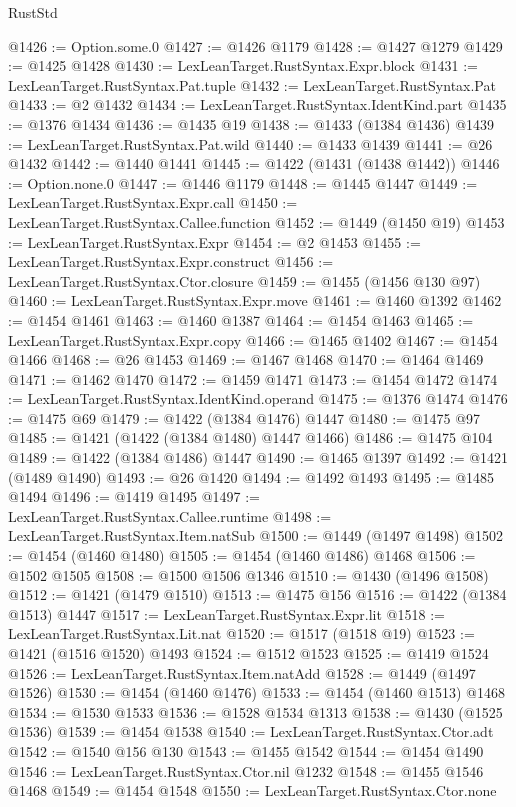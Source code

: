 \begin{lexlean}{RustStd}
\begin{coremodule}
@1426 := Option.some.{0}
@1427 := @1426 @1179
@1428 := @1427 @1279
@1429 := @1425 @1428
@1430 := LexLeanTarget.RustSyntax.Expr.block
@1431 := LexLeanTarget.RustSyntax.Pat.tuple
@1432 := LexLeanTarget.RustSyntax.Pat
@1433 := @2 @1432
@1434 := LexLeanTarget.RustSyntax.IdentKind.part
@1435 := @1376 @1434
@1436 := @1435 @19
@1438 := @1433 (@1384 @1436)
@1439 := LexLeanTarget.RustSyntax.Pat.wild
@1440 := @1433 @1439
@1441 := @26 @1432
@1442 := @1440 @1441
@1445 := @1422 (@1431 (@1438 @1442))
@1446 := Option.none.{0}
@1447 := @1446 @1179
@1448 := @1445 @1447
@1449 := LexLeanTarget.RustSyntax.Expr.call
@1450 := LexLeanTarget.RustSyntax.Callee.function
@1452 := @1449 (@1450 @19)
@1453 := LexLeanTarget.RustSyntax.Expr
@1454 := @2 @1453
@1455 := LexLeanTarget.RustSyntax.Expr.construct
@1456 := LexLeanTarget.RustSyntax.Ctor.closure
@1459 := @1455 (@1456 @130 @97)
@1460 := LexLeanTarget.RustSyntax.Expr.move
@1461 := @1460 @1392
@1462 := @1454 @1461
@1463 := @1460 @1387
@1464 := @1454 @1463
@1465 := LexLeanTarget.RustSyntax.Expr.copy
@1466 := @1465 @1402
@1467 := @1454 @1466
@1468 := @26 @1453
@1469 := @1467 @1468
@1470 := @1464 @1469
@1471 := @1462 @1470
@1472 := @1459 @1471
@1473 := @1454 @1472
@1474 := LexLeanTarget.RustSyntax.IdentKind.operand
@1475 := @1376 @1474
@1476 := @1475 @69
@1479 := @1422 (@1384 @1476) @1447
@1480 := @1475 @97
@1485 := @1421 (@1422 (@1384 @1480) @1447 @1466)
@1486 := @1475 @104
@1489 := @1422 (@1384 @1486) @1447
@1490 := @1465 @1397
@1492 := @1421 (@1489 @1490)
@1493 := @26 @1420
@1494 := @1492 @1493
@1495 := @1485 @1494
@1496 := @1419 @1495
@1497 := LexLeanTarget.RustSyntax.Callee.runtime
@1498 := LexLeanTarget.RustSyntax.Item.natSub
@1500 := @1449 (@1497 @1498)
@1502 := @1454 (@1460 @1480)
@1505 := @1454 (@1460 @1486) @1468
@1506 := @1502 @1505
@1508 := @1500 @1506 @1346
@1510 := @1430 (@1496 @1508)
@1512 := @1421 (@1479 @1510)
@1513 := @1475 @156
@1516 := @1422 (@1384 @1513) @1447
@1517 := LexLeanTarget.RustSyntax.Expr.lit
@1518 := LexLeanTarget.RustSyntax.Lit.nat
@1520 := @1517 (@1518 @19)
@1523 := @1421 (@1516 @1520) @1493
@1524 := @1512 @1523
@1525 := @1419 @1524
@1526 := LexLeanTarget.RustSyntax.Item.natAdd
@1528 := @1449 (@1497 @1526)
@1530 := @1454 (@1460 @1476)
@1533 := @1454 (@1460 @1513) @1468
@1534 := @1530 @1533
@1536 := @1528 @1534 @1313
@1538 := @1430 (@1525 @1536)
@1539 := @1454 @1538
@1540 := LexLeanTarget.RustSyntax.Ctor.adt
@1542 := @1540 @156 @130
@1543 := @1455 @1542
@1544 := @1454 @1490
@1546 := LexLeanTarget.RustSyntax.Ctor.nil @1232
@1548 := @1455 @1546 @1468
@1549 := @1454 @1548
@1550 := LexLeanTarget.RustSyntax.Ctor.none

\end{coremodule}
\end{lexlean}
